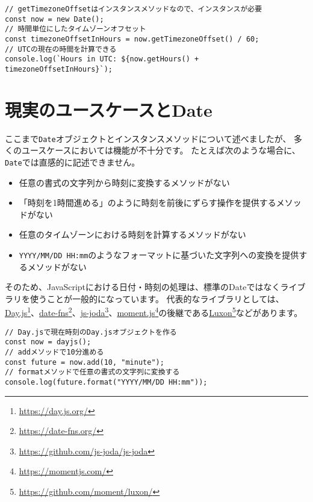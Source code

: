 \begin{lstlisting}
// getTimezoneOffsetはインスタンスメソッドなので、インスタンスが必要
const now = new Date();
// 時間単位にしたタイムゾーンオフセット
const timezoneOffsetInHours = now.getTimezoneOffset() / 60;
// UTCの現在の時間を計算できる
console.log(`Hours in UTC: ${now.getHours() + timezoneOffsetInHours}`);
\end{lstlisting}

\hypertarget{usecase}{%
\section{現実のユースケースとDate}\label{usecase}}

ここまで\texttt{Date}オブジェクトとインスタンスメソッドについて述べましたが、
多くのユースケースにおいては機能が不十分です。
たとえば次のような場合に、\texttt{Date}では直感的に記述できません。

\begin{itemize}
\item
  任意の書式の文字列から時刻に変換するメソッドがない
\item
  「時刻を1時間進める」のように時刻を前後にずらす操作を提供するメソッドがない
\item
  任意のタイムゾーンにおける時刻を計算するメソッドがない
\item
  \texttt{YYYY/MM/DD HH:mm}のようなフォーマットに基づいた文字列への変換を提供するメソッドがない
\end{itemize}

そのため、JavaScriptにおける日付・時刻の処理は、標準のDateではなくライブラリを使うことが一般的になっています。
代表的なライブラリとしては、\href{https://day.js.org/}{Day.js}\footnote{\url{https://day.js.org/}}、\href{https://date-fns.org/}{date-fns}\footnote{\url{https://date-fns.org/}}、\href{https://github.com/js-joda/js-joda}{js-joda}\footnote{\url{https://github.com/js-joda/js-joda}}、\href{https://momentjs.com/}{moment.js}\footnote{\url{https://momentjs.com/}}の後継である\href{https://github.com/moment/luxon/}{Luxon}\footnote{\url{https://github.com/moment/luxon/}}などがあります。

\begin{lstlisting}
// Day.jsで現在時刻のDay.jsオブジェクトを作る
const now = dayjs();
// addメソッドで10分進める
const future = now.add(10, "minute");
// formatメソッドで任意の書式の文字列に変換する
console.log(future.format("YYYY/MM/DD HH:mm")); 
\end{lstlisting}

